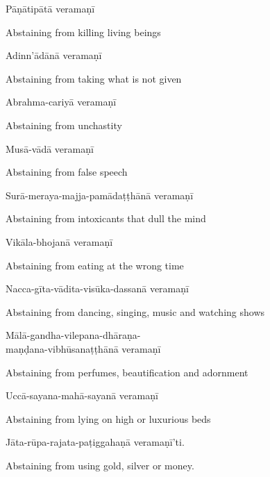 Pāṇātipātā veramaṇī

\begin{english}
  Abstaining from killing living beings
\end{english}

Adinn'ādānā veramaṇī

\begin{english}
  Abstaining from taking what is not given
\end{english}

Abrahma-cariyā veramaṇī

\begin{english}
  Abstaining from unchastity
\end{english}

Musā-vādā veramaṇī

\begin{english}
  Abstaining from false speech
\end{english}

Surā-meraya-majja-pamādaṭṭhānā veramaṇī

\begin{english}
  Abstaining from intoxicants that dull the mind
\end{english}

Vikāla-bhojanā veramaṇī

\begin{english}
  Abstaining from eating at the wrong time
\end{english}

Nacca-gīta-vādita-visūka-dassanā veramaṇī

\begin{english}
  Abstaining from dancing, singing, music and watching shows
\end{english}

Mālā-gandha-vilepana-dhāraṇa-\\
\vin maṇḍana-vibhūsanaṭṭhānā veramaṇī

\begin{english}
  Abstaining from perfumes, beautification and adornment
\end{english}

Uccā-sayana-mahā-sayanā veramaṇī

\begin{english}
  Abstaining from lying on high or luxurious beds
\end{english}

Jāta-rūpa-rajata-paṭiggahaṇā veramaṇī'ti.

\begin{english}
  Abstaining from using gold, silver or money.
\end{english}

